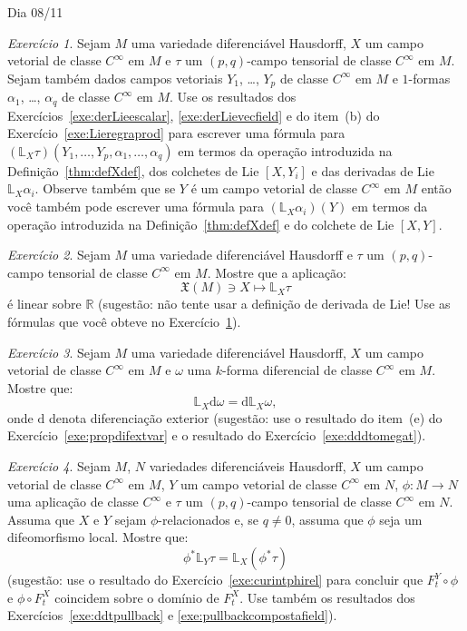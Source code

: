 \documentclass[oneside,11pt]{amsart}
\newcommand{\R}{\mathds R}
\newcommand{\dd}{\mathrm d}
\theoremstyle{remark}\newtheorem{exercise}{Exercício}[section]
\theoremstyle{plain}\newtheorem{teo}{Teorema}[section]
\theoremstyle{plain}\newtheorem{lem}[teo]{Lema}
\theoremstyle{plain}\newtheorem{prop}[teo]{Proposição}
\theoremstyle{definition}\newtheorem{defin}[teo]{Definição}
\theoremstyle{remark}\newtheorem{rem}[teo]{Observação}
\theoremstyle{definition}\newtheorem{example}[teo]{Exemplo}
\numberwithin{equation}{section}
\begin{document}
\begin{section}{Dia 08/11}
\begin{exercise}\label{exe:formulasderLie}
Sejam $M$ uma variedade diferenciável Hausdorff, $X$ um campo vetorial de classe $C^\infty$ em $M$ e $\tau$ um $(p,q)$-campo tensorial
de classe $C^\infty$ em $M$. Sejam também dados campos vetoriais $Y_1$, \dots, $Y_p$ de classe $C^\infty$ em $M$ e $1$-formas $\alpha_1$, \dots, $\alpha_q$
de classe $C^\infty$ em $M$. Use os resultados dos Exercícios~\ref{exe:derLieescalar}, \ref{exe:derLievecfield} e do item~(b) do Exercício~\ref{exe:Lieregraprod}
para escrever uma fórmula para
$(\mathbb L_X\tau)(Y_1,\ldots,Y_p,\alpha_1,\ldots,\alpha_q)$ em termos da operação introduzida na Definição~\ref{thm:defXdef}, dos colchetes
de Lie $[X,Y_i]$ e das derivadas de Lie $\mathbb L_X\alpha_i$. Observe também que se $Y$ é um campo vetorial de classe $C^\infty$ em $M$ então você
também pode escrever uma fórmula para $(\mathbb L_X\alpha_i)(Y)$ em termos da operação introduzida na Definição~\ref{thm:defXdef} e do colchete de Lie
$[X,Y]$.
\end{exercise}

\begin{exercise}
Sejam $M$ uma variedade diferenciável Hausdorff e $\tau$ um $(p,q)$-campo tensorial de classe $C^\infty$ em $M$. Mostre que a aplicação:
\[\mathfrak X(M)\ni X\longmapsto\mathbb L_X\tau\]
é linear sobre $\R$ (sugestão: não tente usar a definição de derivada de Lie! Use as fórmulas que você obteve no Exercício~\ref{exe:formulasderLie}).
\end{exercise}

\begin{exercise}\label{exe:Lieextdif}
Sejam $M$ uma variedade diferenciável Hausdorff, $X$ um campo vetorial de classe $C^\infty$ em $M$ e $\omega$ uma $k$-forma diferencial de classe $C^\infty$ em $M$.
Mostre que:
\[\mathbb L_X\dd\omega=\dd\mathbb L_X\omega,\]
onde $\dd$ denota diferenciação exterior (sugestão: use o resultado do item~(e) do Exercício~\ref{exe:propdifextvar} e o resultado
do Exercício~\ref{exe:dddtomegat}).
\end{exercise}

\begin{exercise}\label{exe:derLiepullback}
Sejam $M$, $N$ variedades diferenciáveis Hausdorff, $X$ um campo vetorial de classe $C^\infty$ em $M$, $Y$ um campo vetorial de classe $C^\infty$ em $N$,
$\phi:M\to N$ uma aplicação de classe $C^\infty$ e $\tau$ um $(p,q)$-campo tensorial de classe $C^\infty$ em $N$. Assuma que $X$ e $Y$ sejam $\phi$-relacionados
e, se $q\ne0$, assuma que $\phi$ seja um difeomorfismo local. Mostre que:
\[\phi^*\mathbb L_Y\tau=\mathbb L_X(\phi^*\tau)\]
(sugestão: use o resultado do Exercício~\ref{exe:curintphirel} para concluir que $F^Y_t\circ\phi$ e $\phi\circ F^X_t$ coincidem sobre o domínio de $F^X_t$.
Use também os resultados dos Exercícios~\ref{exe:ddtpullback} e \ref{exe:pullbackcompostafield}).
\end{exercise}


\end{section}
\end{document}
